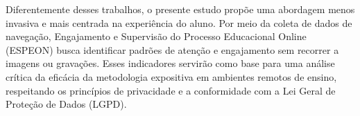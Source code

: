 Diferentemente desses trabalhos, o presente estudo propõe uma abordagem menos invasiva e mais centrada na experiência do aluno. Por meio da coleta de dados de navegação, Engajamento e Supervisão do Processo Educacional Online (ESPEON) busca identificar padrões de atenção e engajamento sem recorrer a imagens ou gravações. Esses indicadores servirão como base para uma análise crítica da eficácia da metodologia expositiva em ambientes remotos de ensino, respeitando os princípios de privacidade e a conformidade com a Lei Geral de Proteção de Dados (LGPD).
